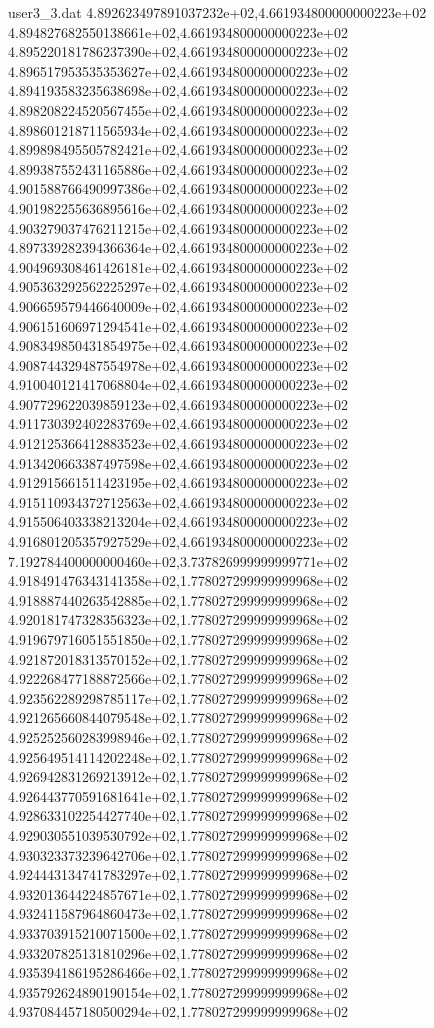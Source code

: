 \begin{filecontents}{user3_3.dat}
4.892623497891037232e+02,4.661934800000000223e+02
4.894827682550138661e+02,4.661934800000000223e+02
4.895220181786237390e+02,4.661934800000000223e+02
4.896517953535353627e+02,4.661934800000000223e+02
4.894193583235638698e+02,4.661934800000000223e+02
4.898208224520567455e+02,4.661934800000000223e+02
4.898601218711565934e+02,4.661934800000000223e+02
4.899898495505782421e+02,4.661934800000000223e+02
4.899387552431165886e+02,4.661934800000000223e+02
4.901588766490997386e+02,4.661934800000000223e+02
4.901982255636895616e+02,4.661934800000000223e+02
4.903279037476211215e+02,4.661934800000000223e+02
4.897339282394366364e+02,4.661934800000000223e+02
4.904969308461426181e+02,4.661934800000000223e+02
4.905363292562225297e+02,4.661934800000000223e+02
4.906659579446640009e+02,4.661934800000000223e+02
4.906151606971294541e+02,4.661934800000000223e+02
4.908349850431854975e+02,4.661934800000000223e+02
4.908744329487554978e+02,4.661934800000000223e+02
4.910040121417068804e+02,4.661934800000000223e+02
4.907729622039859123e+02,4.661934800000000223e+02
4.911730392402283769e+02,4.661934800000000223e+02
4.912125366412883523e+02,4.661934800000000223e+02
4.913420663387497598e+02,4.661934800000000223e+02
4.912915661511423195e+02,4.661934800000000223e+02
4.915110934372712563e+02,4.661934800000000223e+02
4.915506403338213204e+02,4.661934800000000223e+02
4.916801205357927529e+02,4.661934800000000223e+02
7.192784400000000460e+02,3.737826999999999771e+02
4.918491476343141358e+02,1.778027299999999968e+02
4.918887440263542885e+02,1.778027299999999968e+02
4.920181747328356323e+02,1.778027299999999968e+02
4.919679716051551850e+02,1.778027299999999968e+02
4.921872018313570152e+02,1.778027299999999968e+02
4.922268477188872566e+02,1.778027299999999968e+02
4.923562289298785117e+02,1.778027299999999968e+02
4.921265660844079548e+02,1.778027299999999968e+02
4.925252560283998946e+02,1.778027299999999968e+02
4.925649514114202248e+02,1.778027299999999968e+02
4.926942831269213912e+02,1.778027299999999968e+02
4.926443770591681641e+02,1.778027299999999968e+02
4.928633102254427740e+02,1.778027299999999968e+02
4.929030551039530792e+02,1.778027299999999968e+02
4.930323373239642706e+02,1.778027299999999968e+02
4.924443134741783297e+02,1.778027299999999968e+02
4.932013644224857671e+02,1.778027299999999968e+02
4.932411587964860473e+02,1.778027299999999968e+02
4.933703915210071500e+02,1.778027299999999968e+02
4.933207825131810296e+02,1.778027299999999968e+02
4.935394186195286466e+02,1.778027299999999968e+02
4.935792624890190154e+02,1.778027299999999968e+02
4.937084457180500294e+02,1.778027299999999968e+02

\end{filecontents}
